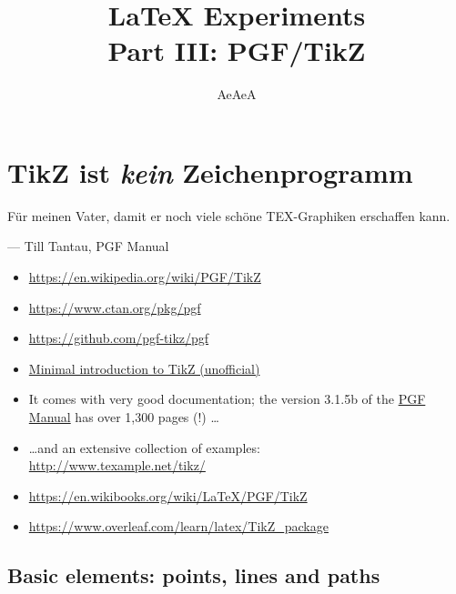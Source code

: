\documentclass[]{article}
\title{\LaTeX{} Experiments\\ Part III: PGF/TikZ}
\author{AeAeA}
\begin{document}
\maketitle

\section{TikZ ist {\itshape kein} Zeichenprogramm}

\epigraph
{Für meinen Vater, damit er noch viele schöne TEX-Graphiken erschaffen kann.}
{--- \textup{Till Tantau}, PGF Manual}


\begin{itemize}
    \item \url{https://en.wikipedia.org/wiki/PGF/TikZ}
    \item \url{https://www.ctan.org/pkg/pgf}
    \item \url{https://github.com/pgf-tikz/pgf}
    \item \href{http://cremeronline.com/LaTeX/minimaltikz.pdf}
               {Minimal introduction to TikZ (unofficial)}
    \item  It comes with very good documentation; the version 3.1.5b of the 
           \href{http://mirrors.ctan.org/graphics/pgf/base/doc/pgfmanual.pdf}
                {PGF Manual} has over 1,300 pages (!) \ldots
    \item \ldots and an extensive collection of examples: \\
          \url{http://www.texample.net/tikz/}
    \item \url{https://en.wikibooks.org/wiki/LaTeX/PGF/TikZ}
    \item \url{https://www.overleaf.com/learn/latex/TikZ_package}
\end{itemize}

\subsection{Basic elements: points, lines and paths}

\end{document}
